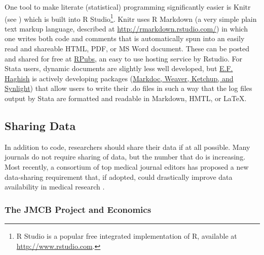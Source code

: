 \documentclass[12pt] {article}
\begin{document}
One tool to make literate (statistical) programming significantly easier
is Knitr (see \cite{xie_dynamic_2013, xie_knitr:_2014}) which is built into R
Studio\footnote{R Studio is a popular free integrated implementation of
  R, available at \href{stylesWithEffects.xml}{http://www.rstudio.com}.}.
Knitr uses R Markdown (a very simple plain text markup language,
described at \url{http://rmarkdown.rstudio.com/}) in which one writes
both code and comments that is automatically spun into an easily read
and shareable HTML, PDF, or MS Word document. These can be posted and
shared for free at \href{https://rpubs.com}{RPubs}, an easy to use
hosting service by Rstudio. For Stata users, dynamic documents are slightly less well developed, but \href{http://www.haghish.com}{E.F. Haghish} is actively developing packages (\href{http://www.haghish.com/statistics/stata-blog/reproducible-research/packages.php}{Markdoc, Weaver, Ketchup, and Synlight}) that allow users to write their .do files in such a way that the log files output by Stata are formatted and readable in Markdown, HMTL, or \LaTeX . 



\subsection{Sharing Data}\label{sharing-data}

In addition to code, researchers should share their data if at all
possible. Many journals do not require sharing of data, but the number
that do is increasing. Most recently, a consortium of top medical journal editors has proposed a new data-sharing requirement that, if adopted, could drastically improve data availability in medical research \citep{ICMJEData}.

\subsubsection{The JMCB Project and
Economics}\label{the-jmcb-project-and-economics}
\end{document}
